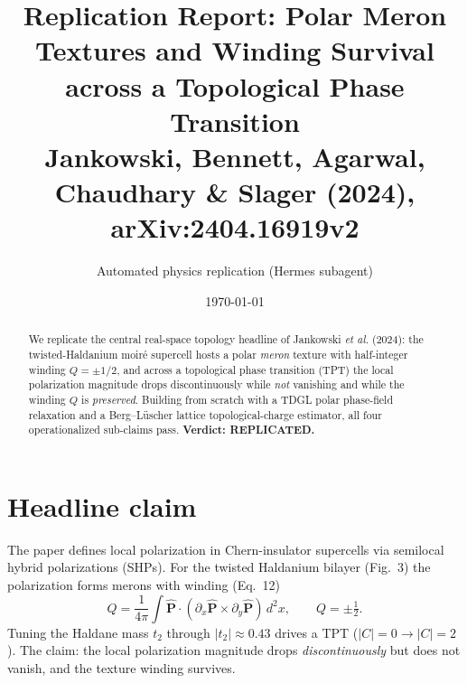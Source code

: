 \documentclass[11pt]{article}
\title{Replication Report: Polar Meron Textures and Winding Survival across a
Topological Phase Transition\\ \large Jankowski, Bennett, Agarwal, Chaudhary \& Slager (2024), arXiv:2404.16919v2}
\author{Automated physics replication (Hermes subagent)}
\date{\today}
\begin{document}
\maketitle

\begin{abstract}
We replicate the central real-space topology headline of Jankowski \emph{et al.}
(2024): the twisted-Haldanium moir\'e supercell hosts a polar \emph{meron}
texture with half-integer winding $Q=\pm 1/2$, and across a topological phase
transition (TPT) the local polarization magnitude drops discontinuously while
\emph{not} vanishing and while the winding $Q$ is \emph{preserved}. Building from
scratch with a TDGL polar phase-field relaxation and a Berg--Lüscher lattice
topological-charge estimator, all four operationalized sub-claims pass.
\textbf{Verdict: REPLICATED.}
\end{abstract}

\section{Headline claim}
The paper defines local polarization in Chern-insulator supercells via semilocal
hybrid polarizations (SHPs). For the twisted Haldanium bilayer (Fig.~3) the
polarization forms merons with winding (Eq.~12)
\begin{equation}
Q=\frac{1}{4\pi}\int \hat{\mathbf P}\cdot\left(\partial_x\hat{\mathbf P}\times
\partial_y\hat{\mathbf P}\right)\,d^2x,\qquad Q=\pm\tfrac12 .
\end{equation}
Tuning the Haldane mass $t_2$ through $|t_2|\!\approx\!0.43$ drives a TPT
($|C|{=}0\!\to\!|C|{=}2$). The claim: the local polarization magnitude drops
\emph{discontinuously} but does not vanish, and the texture winding survives.
\end{document}
